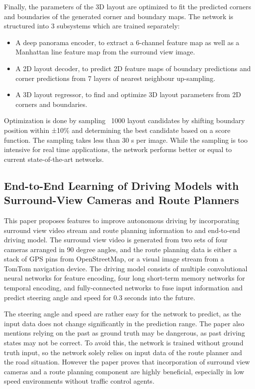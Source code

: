 \documentclass[sigconf, nonacm]{acmart}
\begin{document}
Finally, the parameters of the 3D layout are optimized to fit the predicted corners and boundaries of the generated corner and boundary maps.
The network is structured into 3 subsystems which are trained separately:
\begin{itemize}
\item A deep panorama encoder, to extract a 6-channel feature map as well as a Manhattan line feature map from the surround view image.
\item A 2D layout decoder, to predict 2D feature maps of boundary predictions and corner predictions from 7 layers of nearest neighbour up-sampling.
\item A 3D layout regressor, to find and optimize 3D layout parameters from 2D corners and boundaries.
\end{itemize}
Optimization is done by sampling ~1000 layout candidates by shifting boundary position within ±10\% and determining the best candidate based on a score function.
The sampling takes less than 30 s per image.
While the sampling is too intensive for real time applications, the network performs better or equal to current state-of-the-art networks.

\subsection{End-to-End Learning of Driving Models with Surround-View Cameras and Route Planners \cite{E2EDrivingModel}}
This paper proposes features to improve autonomous driving by incorporating surround view video stream and route planning information to and end-to-end driving model.
The surround view video is generated from two sets of four cameras arranged in 90 degree angles, and the route planning data is either a stack of GPS pins from OpenStreetMap, or a visual image stream from a TomTom navigation device.
The driving model consists of multiple convolutional neural networks for feature encoding, four long short-term memory networks for temporal encoding, and fully-connected networks to fuse input information and predict steering angle and speed for 0.3 seconds into the future.

The steering angle and speed are rather easy for the network to predict, as the input data does not change significantly in the prediction range.
The paper also mentions relying on the past as ground truth may be dangerous, as past driving states may not be correct.
To avoid this, the network is trained without ground truth input, so the network solely relies on input data of the route planner and the road situation.
However the paper proves that incorporation of surround view cameras and a route planning component are highly beneficial, especially in low speed environments without traffic control agents.
\end{document}
